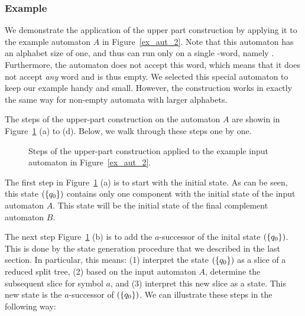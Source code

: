 \subsubsection{Example}
We demonstrate the application of the upper part construction by applying it to the example automaton $A$ in Figure~\ref{ex_aut_2}. Note that this automaton has an alphabet size of one, and thus can run only on a single \om-word, namely \aom. Furthermore, the automaton does not accept this word, which means that it does not accept \textit{any} word and is thus empty. We selected this special  automaton to keep our example handy and small. However, the construction works in exactly the same way for non-empty automata with larger alphabets.

The steps of the upper-part construction on the automaton $A$ are showin in Figure~\ref{steps_upper} (a) to (d). Below, we walk through these steps one by one.

\begin{figure}[htb]
\centering
  \begin{subfigure}[t]{0.49\textwidth}
  \centering
  \UpperPartA
  \caption{}
  \end{subfigure}
  \hfill
  \begin{subfigure}[t]{0.49\textwidth}
  \centering
  \UpperPartB
  \caption{}
  \end{subfigure}

  \begin{subfigure}[t]{0.49\textwidth}
  \centering
  \UpperPartC
  \caption{}
  \end{subfigure}
  \hfill
  \begin{subfigure}[t]{0.49\textwidth}
  \centering
  \UpperPartD
  \caption{}
  \end{subfigure}
\caption{Steps of the upper-part construction applied to the example input automaton in Figure~\ref{ex_aut_2}.}
\label{steps_upper}
\end{figure}

The first step in Figure~\ref{steps_upper} (a) is to start with the initial state. As can be seen, this state $(\{q_{0}\})$ contains only one component with the initial state of the input automaton $A$. This state will be the initial state of the final complement automaton $B$.

The next step Figure~\ref{steps_upper} (b) is to add the $a$-successor of the inital state $(\{q_{0}\})$. This is done by the state generation procedure that we described in the last section. In particular, this means: (1) interpret the state $(\{q_{0}\})$ as a slice of a reduced split tree, (2) based on the input automaton $A$, determine the subsequent slice for symbol $a$, and (3) interpret this new slice as a state. This new state is the $a$-successor of $(\{q_{0}\})$. We can illustrate these steps in the following way:

